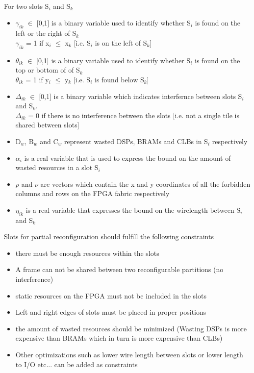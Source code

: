 \documentclass[conference]{IEEEtran}
\begin{document}
For two slots S$_i$ and S$_k$ 
\begin{itemize}
\item $\gamma_{ik}$ $\in$ [0,1] is a binary variable used to identify whether S$_i$ is found on the left or the right of S$_k$\\
$\gamma_{ik}$ = 1 if x$_i$ $\leq$ x$_k$ [i.e. S$_i$ is on the left of S$_k$]
\item $\theta_{ik}$ $\in$ [0,1] is a binary variable used to identify whether S$_i$ is found on the top or bottom of of S$_k$\\
$\theta_{ik}$ = 1 if y$_i$ $\leq$ y$_k$ [i.e. S$_i$ is found below S$_k$]
\item $\Delta_{ik}$ $\in$ [0,1] is a binary variable which indicates interfernce between slots S$_i$ and S$_k$.\\
$\Delta_{ik}$ = 0 if there is no interference between the slots [i.e. not a single tile is shared between slots]
\item D$_{w}$, B$_w$ and C$_w$ represent wasted DSPs, BRAMs and CLBs in S$_i$ respectively
\item $\alpha_i$ is a real variable that is used to express the bound on the amount of wasted resources in a slot S$_i$
\item $\rho$ and $\nu$ are vectors which contain the x and y coordinates of all the forbidden columns and rows on the FPGA fabric respectively 
\item $\eta_{ik}$ is a real variable that expresses the bound on the wirelength between S$_i$ and S$_k$
\end{itemize}


Slots for partial reconfiguration should fulfill the following constraints
\begin{itemize}
\item there must be enough resources within the slots
\item A frame can not be shared between two reconfigurable partitions (no interference)
\item static resources on the FPGA must not be included in the slots 
\item Left and right edges of slots must be placed in proper positions
\item the amount of wasted resources should be minimized (Wasting DSPs is more expensive than BRAMs which in turn is more expensive than CLBs)
\item Other optimizations such as lower wire length between slots or lower length to I/O etc... can be added as constraints
\end{itemize}
\end{document}
